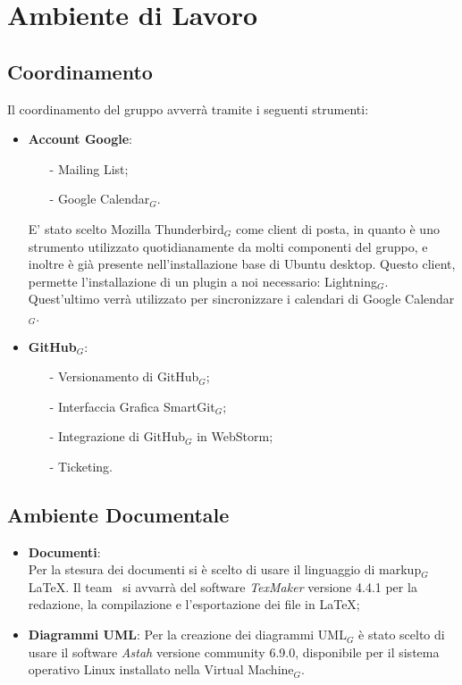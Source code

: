 \section{Ambiente di Lavoro} \label{ambientedilavoro}
\subsection{Coordinamento}
Il coordinamento del gruppo avverrà tramite i seguenti strumenti:
\begin{itemize}
	\item \textbf{Account Google}:
	\begin{itemize}
		\item[-] Mailing List;
		\item[-] Google Calendar$_G$.
	\end{itemize}
	E' stato scelto Mozilla Thunderbird$_G$ come client di posta, in quanto è uno strumento utilizzato quotidianamente da molti componenti del gruppo, e inoltre è già presente nell'installazione base di Ubuntu desktop. Questo client, permette l'installazione di un plugin a noi necessario: Lightning$_G$. Quest'ultimo verrà utilizzato per sincronizzare i calendari di Google Calendar$_G$.
	\item \textbf{GitHub$_G$}:
	\begin{itemize}
		\item[-] Versionamento di GitHub$_G$;
		\item[-] Interfaccia Grafica SmartGit$_G$;
		\item[-] Integrazione di GitHub$_G$ in WebStorm;
		\item[-] Ticketing.
	\end{itemize}
\end{itemize}
\subsection{Ambiente Documentale}
\begin{itemize}
	\item \textbf{Documenti}:\\
	Per la stesura dei documenti si è scelto di usare il linguaggio di markup$_G$ \LaTeX. Il team \gruppo\ si avvarrà del software \textit{TexMaker} versione 4.4.1 per la redazione, la compilazione e l'esportazione dei file in \LaTeX;
	\item \textbf{Diagrammi UML}:
	Per la creazione dei diagrammi UML$_G$ è stato scelto di usare il software \textit{Astah} versione community 6.9.0, disponibile per il sistema operativo Linux installato nella Virtual Machine$_G$.
\end{itemize}
